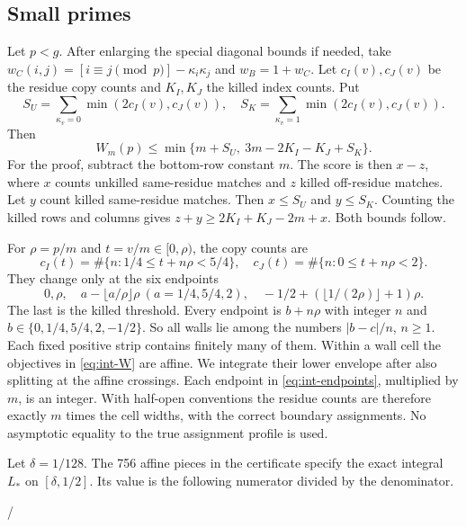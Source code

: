 \subsection{Small primes}

Let \(p<g\). After enlarging the special diagonal bounds if needed, take
\(w_C(i,j)=[i\equiv j\pmod p]-\kappa_i\kappa_j\) and \(w_B=1+w_C\). Let
\(c_I(v),c_J(v)\) be the residue copy counts and \(K_I,K_J\) the killed
index counts. Put
\[
 S_U=\sum_{\kappa_v=0}\min(2c_I(v),c_J(v)),\quad
 S_K=\sum_{\kappa_v=1}\min(2c_I(v),c_J(v)).
\]
Then
\begin{equation}\label{eq:int-W}
 W_m(p)\le\min\{m+S_U,\ 3m-2K_I-K_J+S_K\}.
\end{equation}
For the proof, subtract the bottom-row constant \(m\). The score is then
\(x-z\), where \(x\) counts unkilled same-residue matches and \(z\) killed
off-residue matches. Let \(y\) count killed same-residue matches. Then
\(x\le S_U\) and \(y\le S_K\). Counting the killed rows and columns gives
\(z+y\ge2K_I+K_J-2m+x\). Both bounds follow.

For \(\rho=p/m\) and \(t=v/m\in[0,\rho)\), the copy counts are
\[
 c_I(t)=\#\{n:1/4\le t+n\rho<5/4\},\quad
 c_J(t)=\#\{n:0\le t+n\rho<2\}.
\]
They change only at the six endpoints
\begin{equation}\label{eq:int-endpoints}
 0,\rho,\quad a-\lfloor a/\rho\rfloor\rho\ (a=1/4,5/4,2),
 \quad-1/2+(\lfloor1/(2\rho)\rfloor+1)\rho.
\end{equation}
The last is the killed threshold. Every endpoint is \(b+n\rho\) with
integer \(n\) and \(b\in\{0,1/4,5/4,2,-1/2\}\). So all walls lie among the
numbers \(|b-c|/n\), \(n\ge1\). Each fixed positive strip contains finitely
many of them. Within a wall cell the objectives in \eqref{eq:int-W} are
affine. We integrate their lower envelope after also splitting at the
affine crossings. Each endpoint in \eqref{eq:int-endpoints}, multiplied by
\(m\), is an integer. With half-open conventions the residue counts are
therefore exactly \(m\) times the cell widths, with the correct boundary
assignments. No asymptotic equality to the true assignment profile is used.

Let \(\delta=1/128\). The 756 affine pieces in the certificate specify the
exact integral \(L_*\) on \([\delta,1/2]\). Its value is the following
numerator divided by the denominator.
\begin{center}
\begin{minipage}{0.92\linewidth}\footnotesize\ttfamily
{}
\par\medskip /\par\medskip
{}
\end{minipage}
\end{center}

